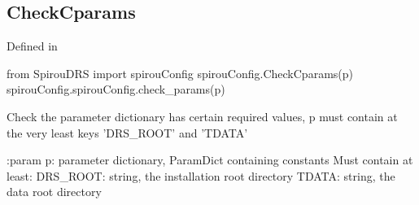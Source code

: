 \noindent\begin{minipage}{\textwidth}
\subsection{CheckCparams}

Defined in \spirouConfig{}

\begin{pythonbox}
from SpirouDRS import spirouConfig
spirouConfig.CheckCparams(p)
spirouConfig.spirouConfig.check_params(p)
\end{pythonbox}

\begin{pythondocstring}
Check the parameter dictionary has certain required values, p must contain
at the very least keys 'DRS_ROOT' and 'TDATA'

:param p: parameter dictionary, ParamDict containing constants
    Must contain at least:
        DRS_ROOT: string, the installation root directory
        TDATA: string, the data root directory


\end{pythondocstring}
\end{minipage}

